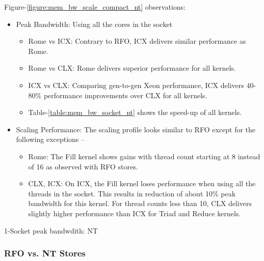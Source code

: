 \documentclass{article}
\begin{document}
Figure-\ref{figure:mem_bw_scale_compact_nt} observations:
\begin{itemize}
\item Peak Bandwidth: Using all the cores in the socket
\begin{itemize}
\item Rome vs ICX: Contrary to RFO, ICX delivers similar performance as Rome.
\item Rome vs CLX: Rome delivers superior performance for all kernels.
\item ICX vs CLX: Comparing gen-to-gen Xeon performance, ICX delivers 40-80\% performance improvements over CLX for all kernels.
\item Table-\ref{table:mem_bw_socket_nt} shows the speed-up of all kernels.
\end{itemize}
\item Scaling Performance: The scaling profile looks similar to RFO except for the following exceptions --
\begin{itemize}
\item Rome: The Fill kernel shows gains with thread count starting at 8 instead of 16 as observed with RFO stores.
\item CLX, ICX: On ICX, the Fill kernel loses performance when using all the threads in the socket. This results in reduction of about 10\% peak bandwidth for this kernel. For thread counts less than 10, CLX delivers slightly higher performance than ICX for Triad and Reduce kernels.
\end{itemize}
\end{itemize}

\begin{table}[h!]
\centering

\caption{1-Socket peak bandwdith: NT}
\label{table:mem_bw_socket_nt}
\end{table}


\subsubsection{RFO vs. NT Stores}
\end{document}
